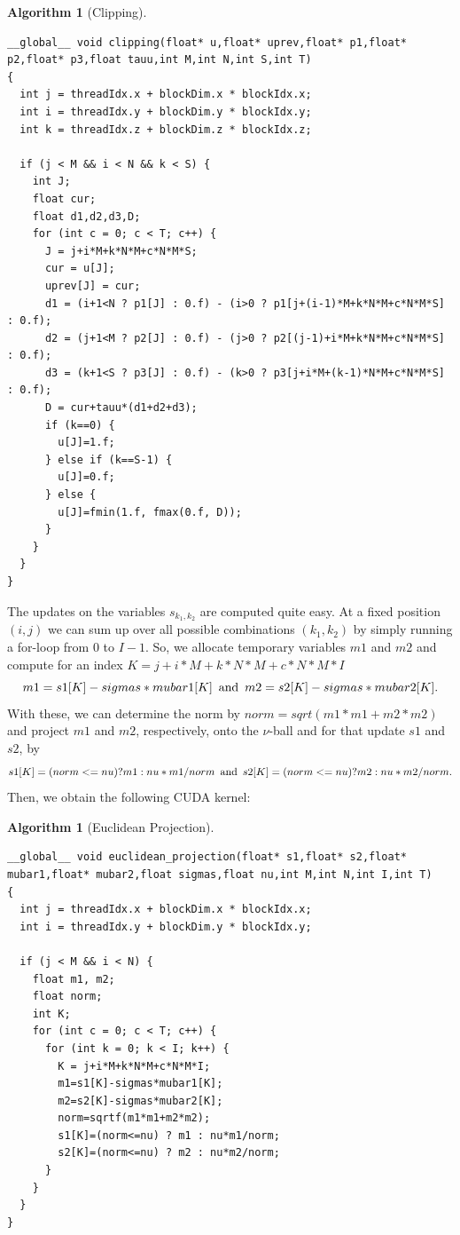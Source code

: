 \documentclass{scrreprt}
\newtheorem{algorithm}[theorem]{Algorithm}
\begin{document}
            \begin{algorithm}[Clipping]
                \label{alg:clipping}
                \begin{lstlisting}
__global__ void clipping(float* u,float* uprev,float* p1,float* p2,float* p3,float tauu,int M,int N,int S,int T)
{
  int j = threadIdx.x + blockDim.x * blockIdx.x;
  int i = threadIdx.y + blockDim.y * blockIdx.y;
  int k = threadIdx.z + blockDim.z * blockIdx.z;

  if (j < M && i < N && k < S) {
    int J;
    float cur;
    float d1,d2,d3,D;
    for (int c = 0; c < T; c++) {
      J = j+i*M+k*N*M+c*N*M*S;
      cur = u[J];
      uprev[J] = cur;
      d1 = (i+1<N ? p1[J] : 0.f) - (i>0 ? p1[j+(i-1)*M+k*N*M+c*N*M*S] : 0.f);
      d2 = (j+1<M ? p2[J] : 0.f) - (j>0 ? p2[(j-1)+i*M+k*N*M+c*N*M*S] : 0.f);
      d3 = (k+1<S ? p3[J] : 0.f) - (k>0 ? p3[j+i*M+(k-1)*N*M+c*N*M*S] : 0.f);
      D = cur+tauu*(d1+d2+d3);
      if (k==0) {
        u[J]=1.f;
      } else if (k==S-1) {
        u[J]=0.f;
      } else {
        u[J]=fmin(1.f, fmax(0.f, D));
      }
    }
  }
}
                \end{lstlisting}
            \end{algorithm}

            The updates on the variables $s_{k_{1}, k_{2}}$ are computed quite easy. At a fixed position $(i,j)$ we can sum up over all possible combinations $(k_{1}, k_{2})$ by simply running a for-loop from $0$ to $I-1$. So, we allocate temporary variables $m1$ and $m2$ and compute for an index $K = j+i*M+k*N*M+c*N*M*I$
                $$
                    m1 = s1[K] - sigmas*mubar1[K] \,\,\, \textnormal{and} \,\,\, m2 = s2[K] - sigmas*mubar2[K].
                $$
            With these, we can determine the norm by $norm = sqrt(m1*m1+m2*m2)$ and project $m1$ and $m2$, respectively, onto the $\nu$-ball and for that update $s1$ and $s2$, by
                $$
                    s1[K]=(norm<=nu) ? m1 : nu*m1/norm \,\,\, \textnormal{and} \,\,\, s2[K]=(norm<=nu) ? m2 : nu*m2/norm.
                $$
            Then, we obtain the following CUDA kernel:

            \begin{algorithm}[Euclidean Projection]
                \label{alg:euclidean_projection}
                \begin{lstlisting}
__global__ void euclidean_projection(float* s1,float* s2,float* mubar1,float* mubar2,float sigmas,float nu,int M,int N,int I,int T)
{
  int j = threadIdx.x + blockDim.x * blockIdx.x;
  int i = threadIdx.y + blockDim.y * blockIdx.y;

  if (j < M && i < N) {
    float m1, m2;
    float norm;
    int K;
    for (int c = 0; c < T; c++) {
      for (int k = 0; k < I; k++) {
        K = j+i*M+k*N*M+c*N*M*I;
        m1=s1[K]-sigmas*mubar1[K];
        m2=s2[K]-sigmas*mubar2[K];
        norm=sqrtf(m1*m1+m2*m2);
        s1[K]=(norm<=nu) ? m1 : nu*m1/norm;
        s2[K]=(norm<=nu) ? m2 : nu*m2/norm;
      }
    }
  }
}
                \end{lstlisting}
            \end{algorithm}
\end{document}
